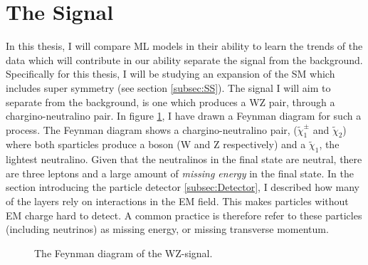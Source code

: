 \section{The Signal}\label{sec:signal}
In this thesis, I will compare \ac{ML} models in their ability to learn the trends of the data which will contribute  
in our ability separate the signal from the background. Specifically for this thesis, I will be studying an expansion of the 
\ac{SM} which includes super symmetry (see section \ref{subsec:SS}). The signal I will aim to separate from the background, is one 
which produces a WZ pair, through a chargino-neutralino pair. In figure \ref{fig:signal}, I have drawn a Feynman diagram for 
such a process. The Feynman diagram shows a chargino-neutralino pair, ($\tilde{\chi}_1^\pm$ and $\tilde{\chi}_2$)
where both sparticles produce a boson (W and Z respectively) and a $\tilde{\chi}_1$, the lightest neutralino. Given that the 
neutralinos in the final state are neutral, there are three leptons and a large amount of \emph{missing energy} in the final state.
In the section introducing the particle detector \ref{subsec:Detector}, I described how many of the layers rely on interactions in 
the \ac{EM} field. This makes particles without \ac{EM} charge hard to detect. A common practice is therefore refer to these particles 
(including neutrinos) as missing energy, or missing transverse momentum.
\begin{figure}[H]
    \centering
    \caption{The Feynman diagram of the WZ-signal.}
    \label{fig:signal}
\end{figure}